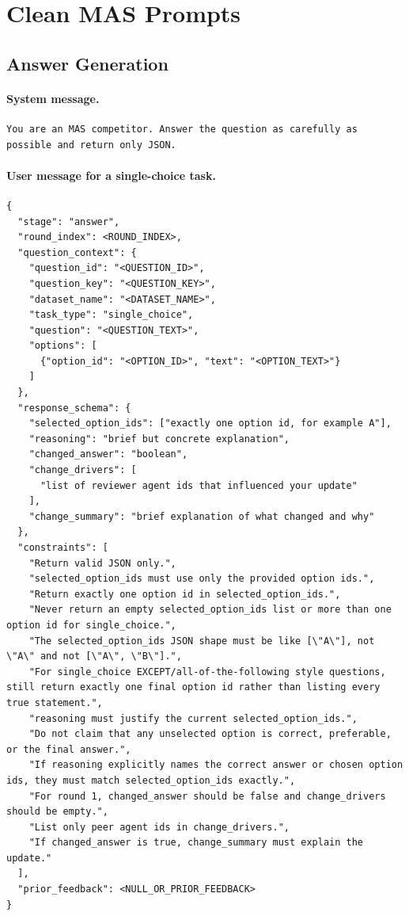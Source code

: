 \documentclass[sigconf,review,anonymous]{acmart}
\begin{document}
\section{Clean MAS Prompts}
\label{sec:clean}

\subsection{Answer Generation}

\paragraph{System message.}
\begin{lstlisting}[style=prompt]
You are an MAS competitor. Answer the question as carefully as possible and return only JSON.
\end{lstlisting}

\paragraph{User message for a single-choice task.}
\begin{lstlisting}[style=prompt]
{
  "stage": "answer",
  "round_index": <ROUND_INDEX>,
  "question_context": {
    "question_id": "<QUESTION_ID>",
    "question_key": "<QUESTION_KEY>",
    "dataset_name": "<DATASET_NAME>",
    "task_type": "single_choice",
    "question": "<QUESTION_TEXT>",
    "options": [
      {"option_id": "<OPTION_ID>", "text": "<OPTION_TEXT>"}
    ]
  },
  "response_schema": {
    "selected_option_ids": ["exactly one option id, for example A"],
    "reasoning": "brief but concrete explanation",
    "changed_answer": "boolean",
    "change_drivers": [
      "list of reviewer agent ids that influenced your update"
    ],
    "change_summary": "brief explanation of what changed and why"
  },
  "constraints": [
    "Return valid JSON only.",
    "selected_option_ids must use only the provided option ids.",
    "Return exactly one option id in selected_option_ids.",
    "Never return an empty selected_option_ids list or more than one option id for single_choice.",
    "The selected_option_ids JSON shape must be like [\"A\"], not \"A\" and not [\"A\", \"B\"].",
    "For single_choice EXCEPT/all-of-the-following style questions, still return exactly one final option id rather than listing every true statement.",
    "reasoning must justify the current selected_option_ids.",
    "Do not claim that any unselected option is correct, preferable, or the final answer.",
    "If reasoning explicitly names the correct answer or chosen option ids, they must match selected_option_ids exactly.",
    "For round 1, changed_answer should be false and change_drivers should be empty.",
    "List only peer agent ids in change_drivers.",
    "If changed_answer is true, change_summary must explain the update."
  ],
  "prior_feedback": <NULL_OR_PRIOR_FEEDBACK>
}
\end{lstlisting}
\end{document}
